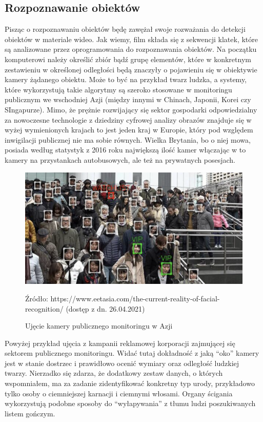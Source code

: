 \documentclass{article}
\begin{document}
	\subsection{Rozpoznawanie obiektów}
	\par
	Pisząc o rozpoznawaniu obiektów będę zawężał swoje rozważania do detekcji obiektów w materiale wideo. Jak wiemy, film składa się z sekwencji klatek, które są analizowane przez oprogramowania do rozpoznawania obiektów. Na początku komputerowi należy określić zbiór bądź grupę elementów, które w konkretnym zestawieniu w określonej odległości będą znaczyły o pojawieniu się w obiektywie kamery żądanego obiektu. Może to być na przykład twarz ludzka, a systemy, które wykorzystują takie algorytmy są szeroko stosowane w monitoringu publicznym we wschodniej Azji (między innymi w Chinach, Japonii, Korei czy SIngapurze). Mimo, że prężnie rozwijający się sektor gospodarki odpowiedzialny za nowoczesne technologie z dziedziny cyfrowej analizy obrazów znajduje się w wyżej wymienionych krajach to jest jeden kraj w Europie, który pod względem inwigilacji publicznej nie ma sobie równych. Wielka Brytania, bo o niej mowa, posiada według statystyk z 2016 roku największą ilość kamer włączając w to kamery na przystankach autobusowych, ale też na prywatnych posesjach.
	\begin{figure}
		\centering
		\includegraphics[width=15cm]{detect}
		\caption{Ujęcie kamery publicznego monitoringu w Azji}
		Źródło: https://www.eetasia.com/the-current-reality-of-facial-recognition/ (dostęp z dn. 26.04.2021)
	\end{figure}
	\par
	Powyżej przykład ujęcia z kampanii reklamowej korporacji zajmującej się sektorem publicznego monitoringu. Widać tutaj dokładność z jaką “oko” kamery jest w stanie dostrzec i prawidłowo ocenić wymiary oraz odległość ludzkiej twarzy. Nierzadko się zdarza, że dodatkowy zestaw danych, o których wspomniałem, ma za zadanie zidentyfikować konkretny typ urody, przykładowo tylko osoby o ciemniejszej karnacji i ciemnymi włosami. Organy ścigania wykorzystują podobne sposoby do “wyłapywania” z tłumu ludzi poszukiwanych listem gończym.
\end{document}
